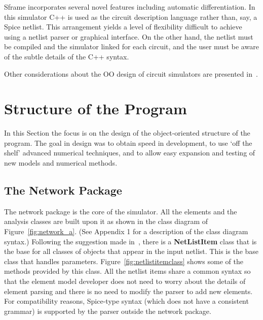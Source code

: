 Sframe incorporates several novel features including automatic
differentiation. In this simulator C++ is used as the circuit
description language rather than, say, a Spice netlist. This
arrangement yields a level of flexibility difficult to achieve using a
netlist parser or graphical interface.  On the other hand, the netlist
must be compiled and the simulator linked for each circuit, and the
user must be aware of the subtle details of the C++ syntax.  

Other considerations about the OO design of circuit simulators are
presented in~\cite{ngoya}.

\section{Structure of the Program}

In this Section the focus is on the design of the object-oriented
structure of the program.  The goal in design was to obtain speed in
development, to use `off the shelf' advanced numerical techniques, and
to allow easy expansion and testing of new models and numerical
methods.


\subsection{The Network Package}

The network package is the core of the simulator. All the elements and
the analysis classes are built upon it as shown in the class diagram
of Figure~\ref{fig:network_a}.  (See Appendix 1 for a description of the
class diagram syntax.)  Following the suggestion made
in~\cite{davis1}, there is a {\bf NetListItem} class that is the base
for all classes of objects that appear in the input netlist. This is
the base class that handles
parameters. Figure~\ref{fig:netlistitemclass} shows some of the
methods provided by this class.  All the netlist items share a common
syntax so that the element model developer does not need to worry
about the details of element parsing and there is no need to modify
the parser to add new elements. For compatibility reasons, Spice-type
syntax (which does not have a consistent grammar) is supported by the
parser outside the network package.

%
\begin{figure*}[htpb]
\centerline{\epsfxsize=13cm }
\caption{The network package is the core of the simulator.} 
\label{fig:network_a}
\end{figure*}
%

